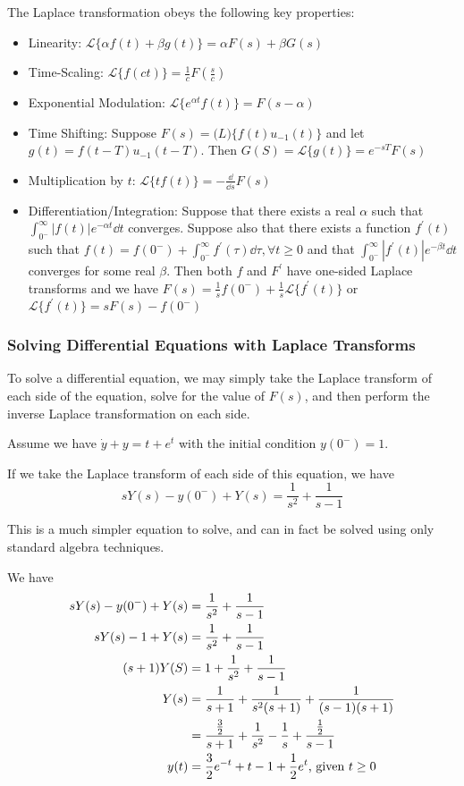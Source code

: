 \documentclass[12pt]{article}
\begin{document}
The Laplace transformation obeys the following key properties:
\begin{itemize}
\item Linearity: $\mathcal{L} \{ \alpha f(t) + \beta g(t) \} = \alpha F(s) + \beta G(s)$
\item Time-Scaling: $\mathcal{L} \{f(ct)\} = \frac{1}{c}F(\frac{s}{c})$
\item Exponential Modulation: $\mathcal{L} \{e^{\alpha t} f(t)\} = F(s-\alpha)$
\item Time Shifting: Suppose $F(s) = \mathcal(L) \{ f(t) u_{-1}(t) \}$ and let $g(t) = f(t - T)u_{-1}(t - T)$. Then $G(S) = \mathcal{L} \{g(t)\} = e^{-sT} F(s)$
\item Multiplication by $t$: $\mathcal{L} \{ tf(t) \} = -\frac{\dd}{\dd s} F(s)$
\item Differentiation/Integration: Suppose that there exists a real $\alpha$ such that $\displaystyle\int_{0^-}^\infty |f(t)| e^{-\alpha t} \dd t$ converges. Suppose also that there exists a function $f^\prime(t)$ such that $f(t) = f(0^-) + \displaystyle\int_{0^-}^\infty f^\prime(\tau) \dd \tau, \forall t \geq 0$ and that $\displaystyle\int_{0^-}^\infty |f^\prime(t)| e^{-\beta t} \dd t$ converges for some real $\beta$. Then both $f$ and $F^\prime$ have one-sided Laplace transforms and we have $F(s) = \frac{1}{s}f(0^-) + \frac{1}{s} \mathcal{L} \{f^\prime(t) \}$ or $\mathcal{L} \{ f^\prime(t) \} = sF(s) - f(0^-)$
\end{itemize}

\subsubsection{Solving Differential Equations with Laplace Transforms}
To solve a differential equation, we may simply take the Laplace transform of each side of the equation, solve for the value of $F(s)$, and then perform the inverse Laplace transformation on each side.

\begin{example}
Assume we have $\dot y + y = t + e^t$ with the initial condition $y(0^-) = 1$.

If we take the Laplace transform of each side of this equation, we have \[ sY(s) - y(0^-) + Y(s) = \frac{1}{s^2} + \frac{1}{s-1} \]

This is a much simpler equation to solve, and can in fact be solved using only standard algebra techniques.

We have
\begin{align*}
sY(s) - y(0^-) + Y(s) &= \frac{1}{s^2} + \frac{1}{s-1}\\
sY(s) - 1 + Y(s) &= \frac{1}{s^2} + \frac{1}{s-1}\\
(s+1)Y(S) &= 1 + \frac{1}{s^2} + \frac{1}{s-1}\\
Y(s) &= \frac{1}{s+1} + \frac{1}{s^2(s+1)} + \frac{1}{(s-1)(s+1)}\\
&= \frac{\frac{3}{2}}{s+1} + \frac{1}{s^2} - \frac{1}{s} + \frac{\frac{1}{2}}{s-1}\\
y(t) &= \frac{3}{2}e^{-t} + t - 1 + \frac{1}{2} e^t \text{, given }t \geq 0
\end{align*}
\end{example}
\end{document}
